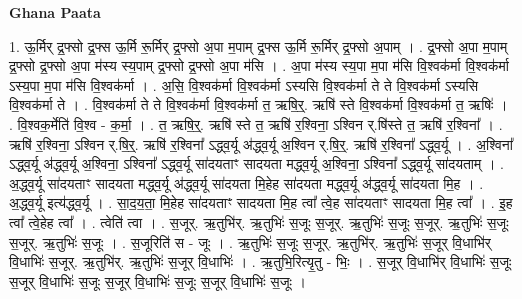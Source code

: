\documentclass[17pt]{extarticle}
\begin{document}
\textbf{Ghana Paata } \newline

1. ऊ॒र्मिर् द्र॒फ्सो द्र॒फ्स ऊ॒र्मि रू॒र्मिर् द्र॒फ्सो अ॒पा म॒पाम् द्र॒फ्स ऊ॒र्मि रू॒र्मिर् द्र॒फ्सो अ॒पाम् । . द्र॒फ्सो अ॒पा म॒पाम् द्र॒फ्सो द्र॒फ्सो अ॒पा म॑स्य स्य॒पाम् द्र॒फ्सो द्र॒फ्सो अ॒पा म॑सि । . अ॒पा म॑स्य स्य॒पा म॒पा म॑सि वि॒श्वक॑र्मा वि॒श्वक॑र्मा ऽस्य॒पा म॒पा म॑सि वि॒श्वक॑र्मा । . अ॒सि॒ वि॒श्वक॑र्मा वि॒श्वक॑र्मा ऽस्यसि वि॒श्वक॑र्मा ते ते वि॒श्वक॑र्मा ऽस्यसि वि॒श्वक॑र्मा ते । . वि॒श्वक॑र्मा ते ते वि॒श्वक॑र्मा वि॒श्वक॑र्मा त॒ ऋषि॒र्॒. ऋषि॑ स्ते वि॒श्वक॑र्मा वि॒श्वक॑र्मा त॒ ऋषिः॑ । . वि॒श्वक॒र्मेति॑ वि॒श्व - क॒र्मा॒ । . त॒ ऋषि॒र्॒. ऋषि॑ स्ते त॒ ऋषि॑ र॒श्विना॒ ऽश्विन र्.षि॑स्ते त॒ ऋषि॑ र॒श्विना᳚ । . ऋषि॑ र॒श्विना॒ ऽश्विन र्.षि॒र्॒. ऋषि॑ र॒श्विना᳚ ऽद्ध्व॒र्यू अ॑द्ध्व॒र्यू अ॒श्विन र्.षि॒र्॒. ऋषि॑ र॒श्विना᳚ ऽद्ध्व॒र्यू । . अ॒श्विना᳚ ऽद्ध्व॒र्यू अ॑द्ध्व॒र्यू अ॒श्विना॒ ऽश्विना᳚ ऽद्ध्व॒र्यू सा॑दयताꣳ सादयता मद्ध्व॒र्यू अ॒श्विना॒ ऽश्विना᳚ ऽद्ध्व॒र्यू सा॑दयताम् । . अ॒द्ध्व॒र्यू सा॑दयताꣳ सादयता मद्ध्व॒र्यू अ॑द्ध्व॒र्यू सा॑दयता मि॒हेह सा॑दयता मद्ध्व॒र्यू अ॑द्ध्व॒र्यू सा॑दयता मि॒ह । . अ॒द्ध्व॒र्यू इत्य॑द्ध्व॒र्यू । . सा॒द॒य॒ता॒ मि॒हेह सा॑दयताꣳ सादयता मि॒ह त्वा᳚ त्वे॒ह सा॑दयताꣳ सादयता मि॒ह त्वा᳚ । . इ॒ह त्वा᳚ त्वे॒हेह त्वा᳚ । . त्वेति॑ त्वा । . स॒जूर्. ऋ॒तुभि॑र्. ऋ॒तुभिः॑ स॒जूः स॒जूर्. ऋ॒तुभिः॑ स॒जूः स॒जूर्. ऋ॒तुभिः॑ स॒जूः स॒जूर्. ऋ॒तुभिः॑ स॒जूः । . स॒जूरिति॑ स - जूः । . ऋ॒तुभिः॑ स॒जूः स॒जूर्. ऋ॒तुभि॑र्. ऋ॒तुभिः॑ स॒जूर् वि॒धाभि॑र् वि॒धाभिः॑ स॒जूर्. ऋ॒तुभि॑र्. ऋ॒तुभिः॑ स॒जूर् वि॒धाभिः॑ । . ऋ॒तुभि॒रित्यृ॒तु - भिः॒ । . स॒जूर् वि॒धाभि॑र् वि॒धाभिः॑ स॒जूः स॒जूर् वि॒धाभिः॑ स॒जूः स॒जूर् वि॒धाभिः॑ स॒जूः स॒जूर् वि॒धाभिः॑ स॒जूः । \newline
\end{document}
